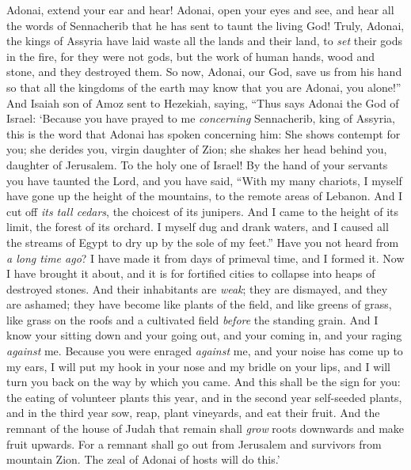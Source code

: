 \begin{biblechapter}
\verse Adonai, extend your ear and hear! Adonai, open your eyes and see, and hear all the words of Sennacherib that he has sent to taunt the living God!
\verse Truly, Adonai, the kings of Assyria have laid waste all the lands and their land,
\verse to \textit{set} their gods in the fire, for they were not gods, but the work of human hands, wood and stone, and they destroyed them.
\verse So now, Adonai, our God, save us from his hand so that all the kingdoms of the earth may know that you are Adonai, you alone!”
 And Isaiah son of Amoz sent to Hezekiah, saying, “Thus says Adonai the God of Israel: ‘Because you have prayed to me \textit{concerning} Sennacherib, king of Assyria,
\verse this is the word that Adonai has spoken concerning him:
\verse She shows contempt for you; she derides you, virgin daughter of Zion; 
she shakes her head behind you, daughter of Jerusalem. To the holy one of Israel!
\verse By the hand of your servants you have taunted the Lord, 
and you have said, “With my many chariots, 
I myself have gone up the height of the mountains, 
to the remote areas of Lebanon. 
And I cut off \textit{its tall cedars}, 
the choicest of its junipers. 
And I came to the height of its limit, 
the forest of its orchard.
\verse I myself dug and drank waters, 
and I caused all the streams of Egypt to dry up by the sole of my feet.”
\verse Have you not heard from \textit{a long time ago}? I have made it 
from days of primeval time, and I formed it. 
Now I have brought it about, 
and it is for fortified cities to collapse into heaps of destroyed stones.
\verse And their inhabitants are \textit{weak}; 
they are dismayed, and they are ashamed; 
they have become like plants of the field, 
and like greens of grass, 
like grass on the roofs 
and a cultivated field \textit{before} the standing grain.
\verse And I know your sitting down and your going out, 
and your coming in, and your raging \textit{against} me.
\verse Because you were enraged \textit{against} me, 
and your noise has come up to my ears, 
I will put my hook in your nose 
and my bridle on your lips, 
and I will turn you back 
on the way by which you came.
\verse And this shall be the sign for you: the eating of volunteer plants this year, and in the second year self-seeded plants, and in the third year sow, reap, plant vineyards, and eat their fruit.
\verse And the remnant of the house of Judah that remain shall \textit{grow} roots downwards and make fruit upwards.
\verse For a remnant shall go out from Jerusalem 
and survivors from mountain Zion. The zeal of Adonai of hosts will do this.’

\end{biblechapter}
